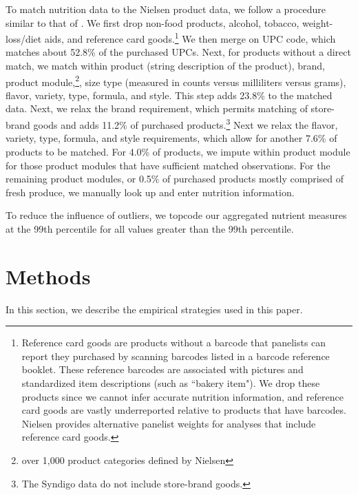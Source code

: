 \documentclass[12pt]{article}
\begin{document}
To match nutrition data to the Nielsen product data, we follow a procedure similar to that of \textcite{dubois2014prices}. We first drop non-food products, alcohol, tobacco, weight-loss/diet aids, and reference card goods.\footnote{Reference card goods are products without a barcode that panelists can report they purchased by scanning barcodes listed in a barcode reference booklet. These reference barcodes are associated with pictures and standardized item descriptions (such as ``bakery item"). We drop these products since we cannot infer accurate nutrition information, and reference card goods are vastly underreported relative to products that have barcodes. Nielsen provides alternative panelist weights for analyses that include reference card goods.} %
We then merge on UPC code, which matches about 52.8\% of the purchased UPCs. Next, for products without a direct match, we match within product (string description of the product), brand, product module,\footnote{over 1,000 product categories defined by Nielsen}, size type (measured in counts versus milliliters versus grams), flavor, variety, type, formula, and style. This step adds 23.8\% to the matched data. Next, we relax the brand requirement, which permits matching of store-brand goods and adds 11.2\% of purchased products.\footnote{The Syndigo data do not include store-brand goods.} Next we relax the flavor, variety, type, formula, and style requirements, which allow for another 7.6\% of products to be matched. For 4.0\% of products, we impute within product module for those product modules that have sufficient matched observations. For the remaining product modules, or 0.5\% of purchased products mostly comprised of fresh produce, we manually look up and enter nutrition information.

To reduce the influence of outliers, we topcode our aggregated nutrient measures at the 99th percentile for all values greater than the 99th percentile. %


\section{Methods} \label{methods}

In this section, we describe the empirical strategies used in this paper.
\end{document}
